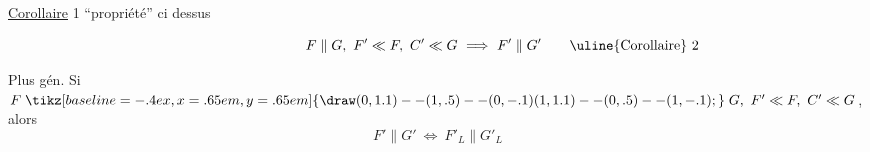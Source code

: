 \uline{Corollaire} 1 \quad {} ``propriété'' ci dessus

\[
F\parallel G,\ F'\ll F,\ C'\ll G\ \Longrightarrow\ F'\parallel G'
\tag*{\makebox[0pt][r]{\makebox[\displaywidth][l]{\uline{Corollaire} 2}}}
\]

Plus gén. \quad Si $F\mathrel{\tikz[baseline=-.4ex,x=.65em,y=.65em]{\draw (0,1.1)--(1,.5)--(0,-.1) (1,1.1)--(0,.5)--(1,-.1);}}G,\ F'\ll F,\ C'\ll G$, alors
\[
 F'\parallel G'\ \Longleftrightarrow\ F'_{L}\parallel G'_{L}
\]
